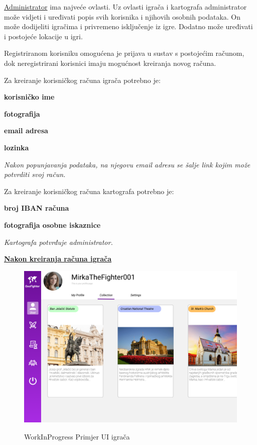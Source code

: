 		\textnormal{\underline{Administrator} ima najveće ovlasti. Uz ovlasti igrača i kartografa administrator može vidjeti i uređivati popis svih korisnika i njihovih osobnih  podataka. On može dodijeliti  igračima i privremeno isključenje iz igre. Dodatno može uređivati i postojeće lokacije u igri.}
		
		\textnormal{Registriranom korisniku omogućena je prijava u sustav s postojećim računom, dok neregistrirani korisnici imaju mogućnost kreiranja novog računa.}
		
		\textnormal{Za kreiranje korisničkog računa igrača potrebno je:}
		\begin{packed_item}
			\item \textbf{korisničko ime}
			\item \textbf{fotografija}
			\item \textbf{email adresa}
			\item \textbf{lozinka}
		\end{packed_item}
		\textit{Nakon  popunjavanja  podataka,  na njegovu email adresu se šalje link kojim može potvrditi svoj račun.}
		
		\textnormal{Za kreiranje korisničkog računa kartografa potrebno je:}
		\begin{packed_item}
			\item \textbf{broj IBAN računa}
			\item \textbf{fotografija osobne iskaznice}
		\end{packed_item}
		\textit{Kartografa potvrđuje administrator.}
		
		\textbf{\underline{Nakon kreiranja računa igrača}}
		\begin{figure}[H]
			
			\includegraphics[scale=0.2]{slike/example} \\%
			\caption{WorkInProgress Primjer UI igrača}
			\label{fig:example} %
		\end{figure}
	
